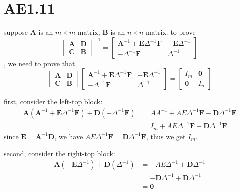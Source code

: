 \documentclass[12pt,a4paper]{article}
\begin{document}
\section{AE1.11}

suppose $\mathbf{A}$ is an $m \times m$ matrix, $\mathbf{B}$ is an $n \times n$ matrix.
to prove
\[
\begin{bmatrix}
    \mathbf{A} & \mathbf{D} \\
    \mathbf{\mathbf{C}} & \mathbf{B}
\end{bmatrix}^{-1} = \begin{bmatrix}
    \mathbf{A}^{-1}+\mathbf{E}\Delta^{-1}\mathbf{F} & -\mathbf{E}\Delta^{-1} \\
    -\Delta^{-1}\mathbf{F} & \Delta^{-1}
\end{bmatrix}
\], 
we need to prove that
\[
    \begin{bmatrix}
        \mathbf{A} & \mathbf{D} \\
        \mathbf{\mathbf{C}} & \mathbf{B}
    \end{bmatrix} \begin{bmatrix}
        \mathbf{A}^{-1}+\mathbf{E}\Delta^{-1}\mathbf{F} & -\mathbf{E}\Delta^{-1} \\
        -\Delta^{-1}\mathbf{F} & \Delta^{-1}
    \end{bmatrix} = \begin{bmatrix}
        I_m & \mathbf{0} \\
        \mathbf{0} & I_n
    \end{bmatrix}
\]

first, consider the left-top block:
\[
    \begin{aligned}
        \mathbf{A}(\mathbf{A}^{-1}+\mathbf{E}\Delta^{-1}\mathbf{F}) + \mathbf{D}(-\Delta^{-1}\mathbf{F}) & = AA^{-1} + AE\Delta^{-1}\mathbf{F} - \mathbf{D}\Delta^{-1}\mathbf{F} \\
                                                     & = I_m + AE\Delta^{-1}\mathbf{F} - \mathbf{D}\Delta^{-1}\mathbf{F}
    \end{aligned}
\]
since $\mathbf{E} = \mathbf{A}^{-1}\mathbf{D}$, we have $AE\Delta^{-1}\mathbf{F} = \mathbf{D}\Delta^{-1}\mathbf{F}$, thus we get $I_m$.

second, consider the right-top block:
\[
    \begin{aligned}
        \mathbf{A}(-\mathbf{E}\Delta^{-1}) + \mathbf{D}(\Delta^{-1}) & = -AE\Delta^{-1} + \mathbf{D}\Delta^{-1} \\
                                          & = -\mathbf{D}\Delta^{-1} + \mathbf{D}\Delta^{-1} \\
                                          & = \mathbf{0}
    \end{aligned}
\]
\end{document}
